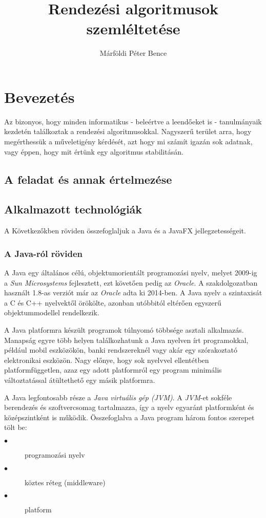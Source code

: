\documentclass{elteikthesis}
\title{Rendezési algoritmusok szemléltetése}
\author{Márföldi Péter Bence}
\begin{document}
\frontmatter

	\maketitle
	\tableofcontents
	
\mainmatter

	\cfoot{\thepage}
	\pagestyle{fancy}

\chapter{Bevezetés} 
Az bizonyos, hogy minden informatikus - beleértve a leendőeket is - tanulmányaik kezdetén találkoztak a rendezési algoritmusokkal. Nagyszerű terület arra, hogy megérthessük a műveletigény kérdését, azt hogy mi számít igazán sok adatnak, vagy éppen, hogy mit értünk egy algoritmus stabilitásán.

\section{A feladat és annak értelmezése} 

\section{Alkalmazott technológiák}
A Következőkben röviden összefoglaljuk a Java\cite{Java} és a JavaFX\cite{JavaFX} jellegzetességeit.
\subsection{A Java-ról röviden}
A Java egy általános célú, objektumorientált programozási nyelv, melyet 2009-ig a \emph{Sun Microsystems} fejlesztett, ezt követően pedig az \emph{Oracle}. A szakdolgozatban használt 1.8-as verziót már az \emph{Oracle} adta ki 2014-ben. A Java nyelv a szintaxisát a C és C++ nyelvektől örökölte, azonban utóbbitól eltérően egyszerű objektummodellel rendelkezik. \par
 A Java platformra készült programok túlnyomó többsége asztali alkalmazás. Manapság egyre több helyen találkozhatunk a Java nyelven írt programokkal, például mobil eszközökön, banki rendszereknél vagy akár egy szórakoztató elektronikai eszközön. Nagy előnye, hogy sok nyelvvel ellentétben platformfüggetlen, azaz egy adott platformról egy program minimális változtatással átültethető egy másik platformra. \par
 A Java legfontosabb része a \emph{Java virtuális gép (JVM)}. A \emph{JVM}-et sokféle berendezés és szoftvercsomag tartalmazza, így a nyelv egyaránt platformként és középszintként is működik.
Összefoglalva a Java program három fontos szerepet tölt be:
\begin{description}
\item[$\bullet$] programozási nyelv
\item[$\bullet$] köztes réteg (middleware)
\item[$\bullet$] platform
\end{description}
\end{document}
